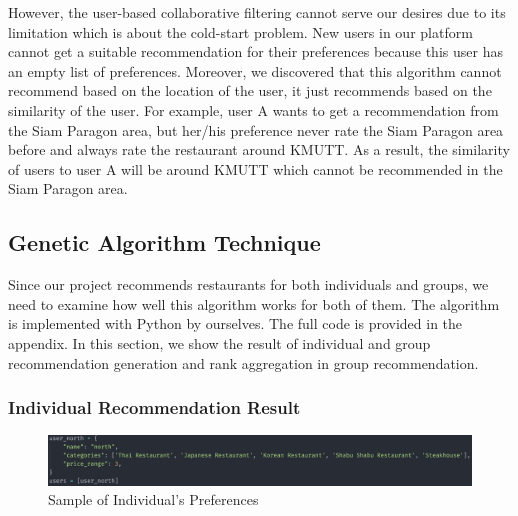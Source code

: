 \documentclass[12pt,oneside,openright,a4paper]{cpe-english-project}
\begin{document}
However, the user-based collaborative filtering cannot serve our desires due to its limitation which is about the cold-start problem. New users in our platform cannot get a suitable recommendation for their preferences because this user has an empty list of preferences. Moreover, we discovered that this algorithm cannot recommend based on the location of the user, it just recommends based on the similarity of the user. For example, user A wants to get a recommendation from the Siam Paragon area, but her/his preference never rate the Siam Paragon area before and always rate the restaurant around KMUTT. As a result, the similarity of users to user A will be around KMUTT which cannot be recommended in the Siam Paragon area.

\subsection{Genetic Algorithm Technique}


Since our project recommends restaurants for both individuals and groups, we need to examine how well this algorithm works for both of them. The algorithm is implemented with Python by ourselves. The full code is provided in the appendix. In this section, we show the result of individual and group recommendation generation and rank aggregation in group recommendation.

\subsubsection{Individual Recommendation Result}


\begin{figure}[H]\centering
\includegraphics[width=350pt]{./images/4SampleofIndividualsPreferences.png}
\caption{Sample of Individual’s Preferences}\label{fig:4SampleofIndividualsPreferences}
\end{figure}\vspace{-24pt}
\end{document}
